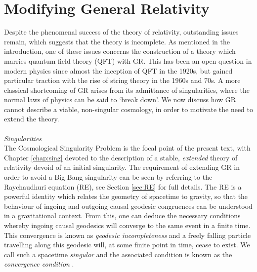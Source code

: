 \section{Modifying General Relativity}
Despite the phenomenal success of the theory of relativity, outstanding issues remain, which suggests that the theory is incomplete. As mentioned in the introduction, one of these issues concerns the construction of a theory which marries  quantum field theory (QFT) with GR. This has been an open question in modern physics since almost the inception of QFT in the 1920s, but gained particular traction with the rise of string theory in the 1960s and 70s.
A more classical shortcoming of GR arises from its admittance of singularities, where the normal laws of physics can be said to `break down'. We now discuss how GR cannot describe a viable, non-singular cosmology, in order to motivate the need to extend the theory.
\\\\ \emph{Singularities}\\
The Cosmological Singularity Problem is the focal point of the present text, with Chapter \ref{chap:sing} devoted to the description of a stable, \emph{extended} theory of relativity devoid of an initial singularity. The requirement of extending GR in order to avoid a Big Bang singularity can be seen by referring to the Raychaudhuri equation (RE), see Section \eqref{sec:RE} for full details. The RE is a powerful identity which relates the geometry of spacetime to gravity, so that the behaviour of ingoing and outgoing causal geodesic congruences can be understood in a gravitational context. From this, one can deduce the necessary conditions whereby ingoing causal geodesics will converge to the same event in a finite time. This convergence is known as \emph{geodesic incompleteness} and a freely falling particle travelling along this geodesic will, at some finite point in time, cease to exist. We call such a spacetime \emph{singular} and the associated condition is known as the \emph{convergence condition} \cite{Geroch:1968ut}. 

